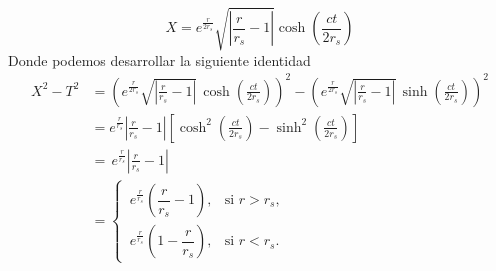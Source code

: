 \begin{equation}
    X  = e^{\frac{r}{2 r_s}} \sqrt{\left|\frac{r}{r_s}-1\right|}  \cosh\left(\frac{ct}{2r_s}\right)
    \label{eq:Kruskal-SzekeresX(r,t)}
\end{equation}
Donde podemos desarrollar la siguiente identidad
\begin{equation}
    \begin{aligned}
        X^2 -T^2 & =  \left( e^{\frac{r}{2r_s}} \sqrt{\left|\frac{r}{r_s}-1\right|}\, \cosh\left(\frac{ct}{2r_s}\right) \right)^2- \left( e^{\frac{r}{2r_s}} \sqrt{\left|\frac{r}{r_s}-1\right|}\, \sinh\left(\frac{ct}{2r_s}\right) \right)^2 \\[1mm]
                 & = e^{\frac{r}{r_s}} \left|\frac{r}{r_s}-1\right| \left[ \cosh^2\left(\frac{ct}{2r_s}\right) -\sinh^2\left(\frac{ct}{2r_s}\right) \right]                                                                                    \\[1mm]
                 & = \, e^{\frac{r}{r_s}} \left|\frac{r}{r_s}-1\right|                                                                                                                                                                         \\[2mm]
                 & =
        \begin{cases}
            \, e^{\frac{r}{r_s}} \left(\dfrac{r}{r_s}-1\right), & \text{si } r > r_s, \\[2mm]
            \, e^{\frac{r}{r_s}} \left(1-\dfrac{r}{r_s}\right), & \text{si } r < r_s.
        \end{cases}
    \end{aligned}
    \label{eq:Kruskal-SzekeresT^2-X^2}
\end{equation}


